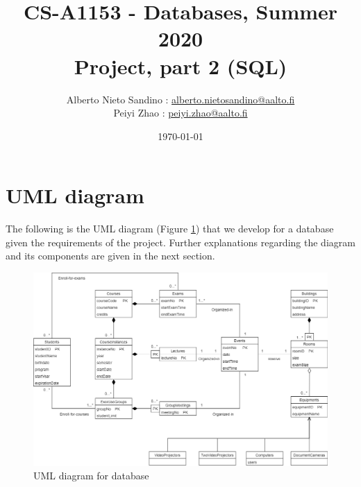 \documentclass{article}
\title{CS-A1153 - Databases, Summer 2020\\
		Project, part 2 (SQL)}
\author{Alberto Nieto Sandino : \href{mailto:alberto.nietosandino@aalto.fi}{alberto.nietosandino@aalto.fi}\\
		Peiyi Zhao : \href{mailto:peiyi.zhao@aalto.fi}{peiyi.zhao@aalto.fi}}
\date{\today}
\begin{document}
\begin{titlepage}
	\maketitle
	\vspace{3cm}
	\tableofcontents
	\thispagestyle{empty}
\end{titlepage}

\cleardoublepage

\section{UML diagram}
The following is the UML diagram (Figure \ref{fig:UML}) that we develop for a database given the requirements of the project. Further explanations regarding the diagram and its components are given in the next section.

\begin{figure}[h]
	\centering
	\includegraphics[width=\textwidth]{UML_project_1.png}
	\caption{UML diagram for database}
	\label{fig:UML}
\end{figure}
\end{document}
